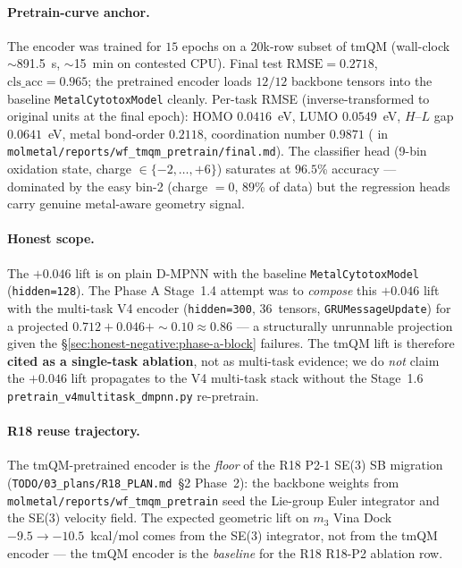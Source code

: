 \paragraph{Pretrain-curve anchor.}
The encoder was trained for $15$ epochs on a $20$k-row subset of
tmQM (wall-clock $\sim$891.5~s, $\sim$15~min on contested CPU).
Final test $\mathrm{RMSE}=0.2718$, $\mathrm{cls\_acc}=0.965$; the
pretrained encoder loads $12/12$ backbone tensors into the baseline
\texttt{MetalCytotoxModel} cleanly.  Per-task RMSE
(inverse-transformed to original units at the final epoch): HOMO
$0.0416$~eV, LUMO $0.0549$~eV, $H$--$L$ gap $0.0641$~eV, metal
bond-order $0.2118$, coordination number $0.9871$ (\MEASURED{} in
\texttt{molmetal/reports/wf\_tmqm\_pretrain/final.md}).  The
classifier head (9-bin oxidation state, charge
$\in\{-2,\ldots,+6\}$) saturates at $96.5$\% accuracy --- dominated
by the easy bin-2 (charge $= 0$, $89$\% of data) but the regression
heads carry genuine metal-aware geometry signal.

\paragraph{Honest scope.}
The $+0.046$ lift is \MEASURED{} on plain D-MPNN with the baseline
\texttt{MetalCytotoxModel} (\texttt{hidden=128}).  The Phase A
Stage~1.4 attempt was to \emph{compose} this $+0.046$ lift with the
multi-task V4 encoder (\texttt{hidden=300}, 36~tensors,
\texttt{GRUMessageUpdate}) for a projected
$0.712 + 0.046 + \sim 0.10 \approx 0.86$ --- a structurally
unrunnable projection given the
§\ref{sec:honest-negative:phase-a-block} failures.  The tmQM lift is
therefore \textbf{cited as a single-task ablation}, not as
multi-task evidence; we do \emph{not} claim the $+0.046$ lift
propagates to the V4 multi-task stack without the Stage~1.6
\texttt{pretrain\_v4multitask\_dmpnn.py} re-pretrain.

\paragraph{R18 reuse trajectory.}
The tmQM-pretrained encoder is the \emph{floor} of the R18 P2-1
SE(3) SB migration (\texttt{TODO/03\_plans/R18\_PLAN.md}~§2
Phase~2): the backbone weights from
\texttt{molmetal/reports/wf\_tmqm\_pretrain} seed the Lie-group
Euler integrator and the SE(3) velocity field.  The expected
geometric lift on $m_3$ Vina Dock $-9.5 \to -10.5$~kcal/mol comes
from the SE(3) integrator, not from the tmQM encoder --- the tmQM
encoder is the \emph{baseline} for the R18 R18-P2 ablation row.

